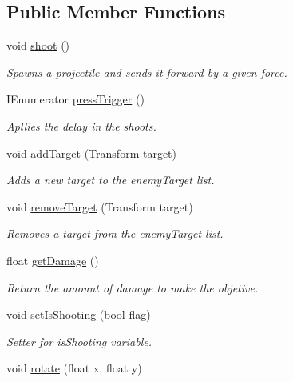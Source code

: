 \subsection*{Public Member Functions}
\begin{DoxyCompactItemize}
\item 
void \mbox{\hyperlink{class_turret_mini_gun_a85ac788b061c745f1b920e749771ec1c}{shoot}} ()
\begin{DoxyCompactList}\small\item\em Spawns a projectile and sends it forward by a given force. \end{DoxyCompactList}\item 
I\+Enumerator \mbox{\hyperlink{class_turret_mini_gun_a1fddb95fa87c0de06be43cfbc9e97c81}{press\+Trigger}} ()
\begin{DoxyCompactList}\small\item\em Apllies the delay in the shoots. \end{DoxyCompactList}\item 
void \mbox{\hyperlink{class_turret_mini_gun_a355f34666865396437c32fab8d2a3b51}{add\+Target}} (Transform target)
\begin{DoxyCompactList}\small\item\em Adds a new target to the enemy\+Target list. \end{DoxyCompactList}\item 
void \mbox{\hyperlink{class_turret_mini_gun_a8d975f5b522d64c92b69852af5c58db6}{remove\+Target}} (Transform target)
\begin{DoxyCompactList}\small\item\em Removes a target from the enemy\+Target list. \end{DoxyCompactList}\item 
float \mbox{\hyperlink{class_turret_mini_gun_ac1c64dbcd1857130d1bd6786c6e695b9}{get\+Damage}} ()
\begin{DoxyCompactList}\small\item\em Return the amount of damage to make the objetive. \end{DoxyCompactList}\item 
void \mbox{\hyperlink{class_turret_mini_gun_ab783f041cc7969bc9477a2c33ff4fc92}{set\+Is\+Shooting}} (bool flag)
\begin{DoxyCompactList}\small\item\em Setter for is\+Shooting variable. \end{DoxyCompactList}\item 
void \mbox{\hyperlink{class_turret_mini_gun_a31f68aef8df52f09916e4540c47c9fde}{rotate}} (float x, float y)

\end{DoxyCompactItemize}
